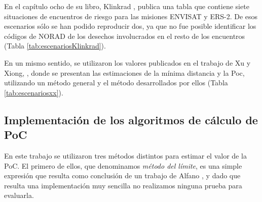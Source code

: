 En el cap\'itulo ocho de su libro, Klinkrad \citep{Klinkrad}, publica una tabla que contiene siete situaciones de encuentros de riesgo para las misiones ENVISAT y ERS-2. De esos escenarios s\'olo se han podido reproducir dos, ya que no fue posible identificar los c\'odigos de NORAD de los desechos involucrados en el resto de los encuentros (Tabla \ref{tab:escenariosKlinkrad}).

\begin{table}[!h]
 \caption{Casos de prueba tomados del libro de Klinkrad \citep{Klinkrad}.}
\label{tab:escenariosKlinkrad}
\end{table}

En un mismo sentido, se utilizaron los valores publicados en el trabajo de Xu y  Xiong, \citep{xu2014method}, donde  se presentan las estimaciones de la m\'inima distancia y la Poc, utilizando un m\'etodo general y el m\'etodo desarrollados por ellos (Tabla \ref{tab:escenariosxx}).\\

\begin{table}[H]
\caption{Casos de prueba tomados del trabajo de  Xu \& Xiong \citep{xu2014method}.}
\label{tab:escenariosxx}
\end{table}

\subsection*{Implementaci\'on de los algoritmos de c\'alculo de PoC}
En este trabajo se utilizaron tres m\'etodos distintos para estimar el valor de la PoC. El primero de ellos, que denominamos {\it{m\'etodo del l\'imite}}, es una simple expresi\'on que resulta como conclusi\'on de un trabajo de Alfano \citep{alfano2008method}, y dado que resulta una implementaci\'on muy sencilla no realizamos ninguna prueba para evaluarla.

